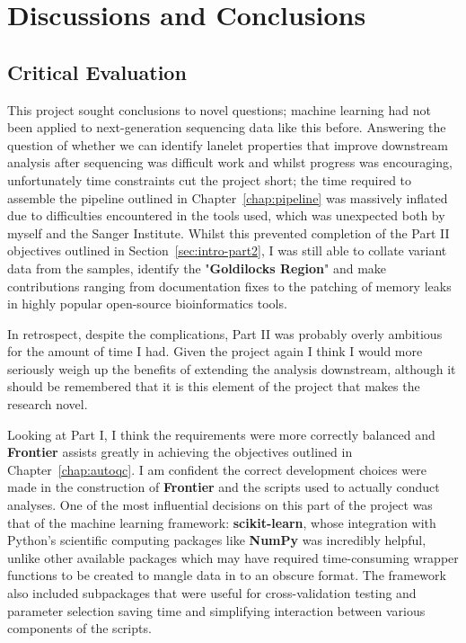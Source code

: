 \part{Discussions and Conclusions}

\chapter{Critical Evaluation}

This project sought conclusions to novel questions; machine learning had not
been applied to next-generation sequencing data like this before.  Answering the
question of whether we can identify lanelet properties that improve downstream
analysis after sequencing was difficult work and whilst progress was
encouraging, unfortunately time constraints cut the project short; the time
required to assemble the pipeline outlined in Chapter~\ref{chap:pipeline} was
massively inflated due to difficulties encountered in the tools used, which was
unexpected both by myself and the Sanger Institute.  Whilst this prevented
completion of the Part II objectives outlined in Section~\ref{sec:intro-part2},
I was still able to collate variant data from the samples, identify the
"\textbf{Goldilocks Region}" and make contributions ranging from documentation
fixes to the patching of memory leaks in highly popular open-source
bioinformatics tools.

In retrospect, despite the complications, Part II was probably overly
ambitious for the amount of time I had. Given the project again I think I would
more seriously weigh up the benefits of extending the analysis downstream,
although it should be remembered that it is this element of the project that
makes the research novel.

Looking at Part I, I think the requirements were more correctly balanced and
\textbf{Frontier} assists greatly in achieving the objectives outlined in
Chapter~\ref{chap:autoqc}. I am confident the correct development choices were
made in the construction of \textbf{Frontier} and the scripts used to actually
conduct analyses. One of the most influential decisions on this part of the
project was that of the machine learning framework: \textbf{scikit-learn}, whose
integration with Python's scientific computing packages like \textbf{NumPy} was
incredibly helpful, unlike other available packages which may have required
time-consuming wrapper functions to be created to mangle data in to an obscure
format. The framework also included subpackages that were useful for
cross-validation testing and parameter selection saving time and simplifying
interaction between various components of the scripts.


